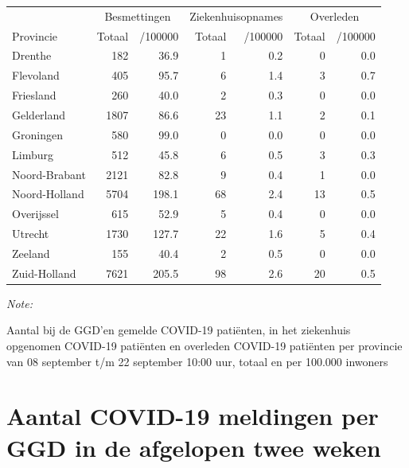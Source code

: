 \documentclass[
  english,
  man,floatsintext]{apa6}
\begin{document}
\begin{table}[H]
\centering
\begin{threeparttable}
\begin{tabular}{lrrrrrr}
\toprule
\multicolumn{1}{c}{ } & \multicolumn{2}{c}{Besmettingen} & \multicolumn{2}{c}{Ziekenhuisopnames} & \multicolumn{2}{c}{Overleden} \\
\cmidrule(l{3pt}r{3pt}){2-3} \cmidrule(l{3pt}r{3pt}){4-5} \cmidrule(l{3pt}r{3pt}){6-7}
Provincie & Totaal & /100000 & Totaal & /100000 & Totaal & /100000\\
\midrule
Drenthe & 182 & 36.9 & 1 & 0.2 & 0 & 0.0\\
Flevoland & 405 & 95.7 & 6 & 1.4 & 3 & 0.7\\
Friesland & 260 & 40.0 & 2 & 0.3 & 0 & 0.0\\
Gelderland & 1807 & 86.6 & 23 & 1.1 & 2 & 0.1\\
Groningen & 580 & 99.0 & 0 & 0.0 & 0 & 0.0\\
Limburg & 512 & 45.8 & 6 & 0.5 & 3 & 0.3\\
Noord-Brabant & 2121 & 82.8 & 9 & 0.4 & 1 & 0.0\\
Noord-Holland & 5704 & 198.1 & 68 & 2.4 & 13 & 0.5\\
Overijssel & 615 & 52.9 & 5 & 0.4 & 0 & 0.0\\
Utrecht & 1730 & 127.7 & 22 & 1.6 & 5 & 0.4\\
Zeeland & 155 & 40.4 & 2 & 0.5 & 0 & 0.0\\
Zuid-Holland & 7621 & 205.5 & 98 & 2.6 & 20 & 0.5\\
\bottomrule
\end{tabular}
\begin{tablenotes}
\item \textit{Note: } 
\item Aantal bij de GGD’en gemelde COVID-19 patiënten, in het ziekenhuis opgenomen COVID-19 patiënten en overleden COVID-19 patiënten per provincie van 08 september t/m 22 september 10:00 uur, totaal en per 100.000 inwoners
\end{tablenotes}
\end{threeparttable}
\end{table}

\newpage

\hypertarget{aantal-covid-19-meldingen-per-ggd-in-de-afgelopen-twee-weken}{%
\section{Aantal COVID-19 meldingen per GGD in de afgelopen twee weken}\label{aantal-covid-19-meldingen-per-ggd-in-de-afgelopen-twee-weken}}
\end{document}
